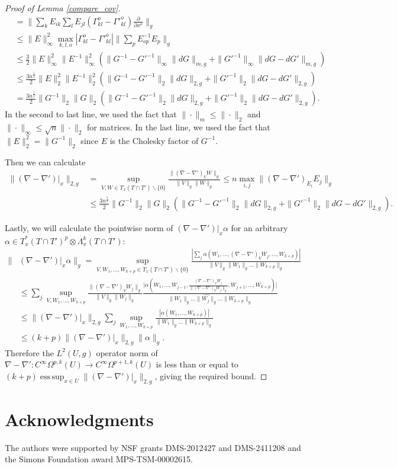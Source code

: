 \documentclass[11pt]{article}
\newcommand{\pdiff}[2]{\frac{\partial #1}{\partial #2}}
\DeclareMathOperator*{\esssup}{ess\,sup}
\begin{document}
\begin{proof}[Proof of Lemma \ref{compare_cov}]
\begin{align*}
&= \bigg\|\sum_kE_{ik}\sum_lE_{jl}(\Gamma^o_{kl} - \Gamma'^o_{kl})\pdiff{}{x^o}\bigg\|_g \\
&\le \|E\|_\infty^2\max_{k,l,o}|\Gamma^o_{kl} - \Gamma'^o_{kl}|\bigg\|\sum_p E^{-1}_{op}E_p\bigg\|_g\\
&\le \frac{3}{2}\|E\|_\infty^2\|E^{-1}\|_\infty^2(\|G^{-1} - G'^{-1}\|_\infty\|dG\|_{m,g} + \|G'^{-1}\|_\infty\|dG - dG'\|_{m,g})\\
&\le \frac{3n^\frac{5}{2}}{2}\|E\|^2_2\|E^{-1}\|_2^2(\|G^{-1} - G'^{-1}\|_2\|dG\|_{2,g} + \|G'^{-1}\|_2\|dG - dG'\|_{2,g})\\
&= \frac{3n^\frac{5}{2}}{2}\|G^{-1}\|_2\|G\|_2(\|G^{-1} - G'^{-1}\|_2\|dG\|_{2,g} + \|G'^{-1}\|_2\|dG - dG'\|_{2,g}).
\end{align*}
In the second to last line, we used the fact that $\|\cdot\|_m \le \|\cdot\|_2$ and $\|\cdot\|_\infty \le \sqrt{n}\|\cdot\|_2$ for matrices. In the last line, we used the fact that $\|E\|_2^2 = \|G^{-1}\|_2$ since $E$ is the Cholesky factor of $G^{-1}$.

Then we can calculate
\begin{align*}
\|(\nabla - \nabla')|_x\|_{2,g} &= \sup_{V,W \in T_x(T \cap T') \backslash \{0\}} \frac{\|(\nabla - \nabla')_VW\|_g}{\|V\|_g\|W\|_g} \le n\max_{i,j} \|(\nabla - \nabla')_{E_i}E_j\|_g \\
&\le \frac{3n^\frac{7}{2}}{2}\|G^{-1}\|_2\|G\|_2(\|G^{-1} - G'^{-1}\|_2\|dG\|_{2,g} + \|G'^{-1}\|_2\|dG - dG'\|_{2,g}).
\end{align*}

Lastly, we will calculate the pointwise norm of $(\nabla - \nabla')|_x\alpha$ for an arbitrary $\alpha \in T_x^*(T \cap T')^p \otimes \Lambda^k_x(T \cap T')$:
\begin{align*}
\|&(\nabla - \nabla')|_x\alpha\|_g = \sup_{V,W_1,\dots,W_{k+p} \in T_x(T \cap T') \backslash \{0\}}\frac{|\sum_j\alpha (W_1,\dots,(\nabla - \nabla')_VW_j,\dots,W_{k+p})|}{\|V\|_g\|W_1\|_g\dots\|W_{k+p}\|_g}\\
&\le \sum_j \sup_{V,W_1,\dots,W_{k+p}}\frac{\|(\nabla - \nabla')_VW_j\|_g}{\|V\|_g\|W_j\|_g}\frac{\big|\alpha(W_1,\dots,W_{j-1},\frac{(\nabla - \nabla')_VW_j}{\|(\nabla - \nabla')_VW_j\|_g},W_{j+1},\dots,W_{k+p})\big|}{\|W_1\|_g\dots\widehat{\|W_j\|_g}\dots\|W_{k+p}\|_g}\\
&\le \|(\nabla - \nabla')|_x\|_{2,g} \sum_j \sup_{W_1,\dots,W_{k+p}}\frac{|\alpha(W_1,\dots,W_{k+p})|}{\|W_1\|_g\dots\|W_{k+p}\|_g}\\
&\le (k+p)\|(\nabla - \nabla')|_x\|_{2,g}\|\alpha\|_g.
\end{align*}
Therefore the $L^2(U,g)$ operator norm of $\nabla - \nabla': C^\infty\Omega^{p,k}(U) \to C^\infty\Omega^{p+1,k}(U)$ is less than or equal to $(k+p)\esssup_{x \in U} \|(\nabla - \nabla')|_x\|_{2,g}$, giving the required bound.

\end{proof}

\section*{Acknowledgments}
The authors were supported by NSF grants DMS-2012427 and DMS-2411208 and the Simons Foundation award MPS-TSM-00002615.

% 
\printbibliography
\end{document}
